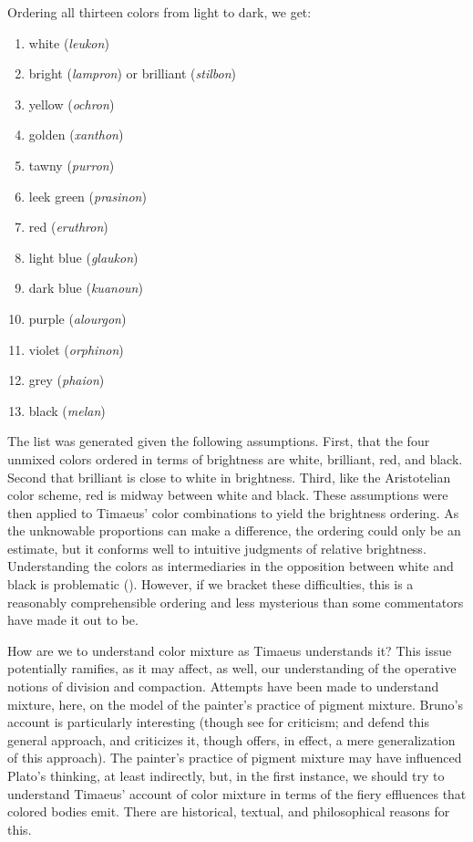 Ordering all thirteen colors from light to dark, we get:
\begin{enumerate}[(1)]
	\item white (\emph{leukon}) 
	\item bright (\emph{lampron}) or brilliant (\emph{stilbon})
	\item yellow (\emph{ochron})
	\item golden (\emph{xanthon})
	\item tawny (\emph{purron})
	\item leek green (\emph{prasinon})
	\item red (\emph{eruthron})
	\item light blue (\emph{glaukon})
	\item dark blue (\emph{kuanoun})
	\item purple (\emph{alourgon})
	\item violet (\emph{orphinon})
	\item grey (\emph{phaion})
	\item black (\emph{melan})
\end{enumerate}
The list was generated given the following assumptions. First, that the four unmixed colors ordered in terms of brightness are white, brilliant, red, and black. Second that brilliant is close to white in brightness. Third, like the Aristotelian color scheme, red is midway between white and black. These assumptions were then applied to Timaeus' color combinations to yield the brightness ordering. As the unknowable proportions can make a difference, the ordering could only be an estimate, but it conforms well to intuitive judgments of relative brightness. Understanding the colors as intermediaries in the opposition between white and black is problematic (\citealt[chapter 6.3]{Kalderon:2015fr}). However, if we bracket these difficulties, this is a reasonably comprehensible ordering and less mysterious than some commentators have made it out to be.

How are we to understand color mixture as Timaeus understands it? This issue potentially ramifies, as it may affect, as well, our understanding of the operative notions of division and compaction. Attempts have been made to understand mixture, here, on the model of the painter's practice of pigment mixture. Bruno's \citeyearpar[chapter 10]{Bruno:1977fk} account is particularly interesting (though see \citealt[]{Gage:1993aa} for criticism; \citealt[278]{Cornford:1935fk} and \citealt{Levides:2002aa} defend this general approach, and \citealt{Struycken:2003zr} criticizes it, though offers, in effect, a mere generalization of this approach). The painter's practice of pigment mixture may have influenced Plato's thinking, at least indirectly, but, in the first instance, we should try to understand Timaeus' account of color mixture in terms of the fiery effluences that colored bodies emit. There are historical, textual, and philosophical reasons for this. 

